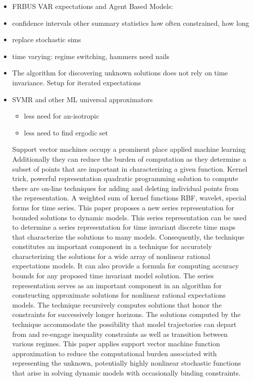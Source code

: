 \documentclass[12pt]{article}
\begin{document}
\begin{itemize}
\item FRBUS VAR expectations and Agent Based Models:
\item confidence intervals other  summary statistics how often constrained, how long
\item replace stochastic sims
\item time varying:  regime switching, hammers need nails
\item The algorithm for discovering unknown solutions does not rely on time invariance.  Setup for iterated expectations
\item SVMR and other ML universal approximators
  \begin{itemize}
  \item less need for an-isotropic
  \item less need to find ergodic set
  \end{itemize}
Support vector machines occupy a prominent place applied machine learning
Additionally they can reduce the burden of computation as they determine 
a subset of points that are important in characterizing a given function.
Kernel trick,  powerful representation quadratic programming solution to compute there are on-line techniques for adding and deleting individual points from the representation.  A weighted sum of kernel functions RBF, wavelet, special forms for time series.
  This paper proposes a new series representation for bounded solutions to dynamic models. This series representation can be used
to determine a series representation for time invariant discrete time
maps that characterize the solutions to many models. Consequently,
the technique constitutes an important component in a technique for
accurately characterizing the solutions for a wide array of nonlinear
rational expectations models. It can also provide a formula for computing accuracy bounds for any proposed time invariant model solution. The series representation serves as an important component
in an algorithm for constructing approximate solutions for nonlinear
rational expectations models.
The technique recursively computes solutions that honor the constraints for successively longer horizons.  The solutions computed by
the technique accommodate the possibility that model trajectories can
depart from and re-engage inequality constraints as well as transition
between various regimes.
This paper applies support vector machine function approximation to
reduce the computational burden associated with representing the
unknown, potentially highly nonlinear stochastic functions that arise in
solving dynamic models with occasionally binding constraints.



\end{itemize}
\end{document}
